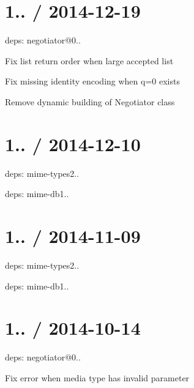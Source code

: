 \section*{1.. / 2014-\/12-\/19 }


\begin{DoxyItemize}
\item deps\+: negotiator@0..
\begin{DoxyItemize}
\item Fix list return order when large accepted list
\item Fix missing identity encoding when q=0 exists
\item Remove dynamic building of Negotiator class
\end{DoxyItemize}
\end{DoxyItemize}

\section*{1.. / 2014-\/12-\/10 }


\begin{DoxyItemize}
\item deps\+: mime-\/types2..
\begin{DoxyItemize}
\item deps\+: mime-\/db1..
\end{DoxyItemize}
\end{DoxyItemize}

\section*{1.. / 2014-\/11-\/09 }


\begin{DoxyItemize}
\item deps\+: mime-\/types2..
\begin{DoxyItemize}
\item deps\+: mime-\/db1..
\end{DoxyItemize}
\end{DoxyItemize}

\section*{1.. / 2014-\/10-\/14 }


\begin{DoxyItemize}
\item deps\+: negotiator@0..
\begin{DoxyItemize}
\item Fix error when media type has invalid parameter
\end{DoxyItemize}
\end{DoxyItemize}

